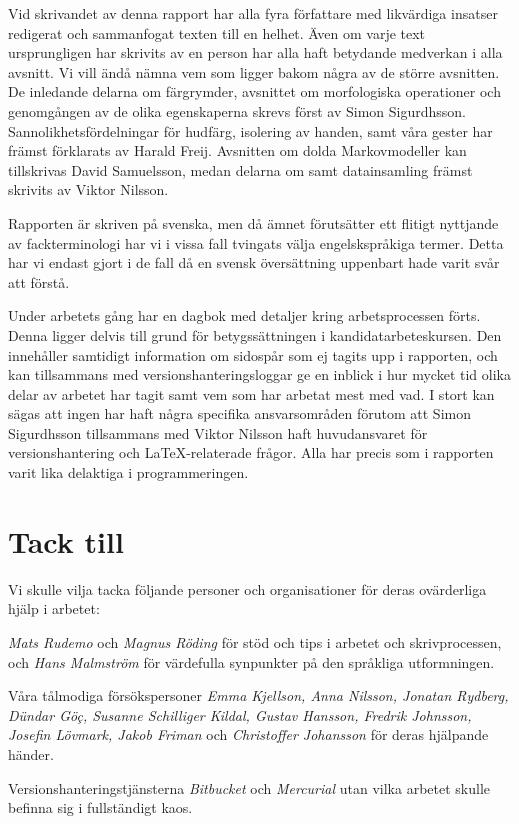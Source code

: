 \documentclass[../rapport_MVEX01-11-05]{subfiles}
\begin{document}
Vid skrivandet av denna rapport har alla fyra författare 
med likvärdiga insatser redigerat och sammanfogat
texten till en helhet. Även om varje text ursprungligen har skrivits av en
person har alla haft betydande medverkan i alla avsnitt.
Vi vill ändå nämna vem som ligger bakom några av de större avsnitten.
De inledande delarna om färgrymder, avsnittet om morfologiska operationer
och genomgången av de olika egenskaperna skrevs först av Simon Sigurdhsson.
Sannolikhetsfördelningar för hudfärg, isolering av handen, samt våra gester
har främst förklarats av Harald Freij.
Avsnitten om dolda Markovmodeller kan tillskrivas David Samuelsson, medan
delarna om \knn samt datainsamling främst skrivits av Viktor Nilsson.

Rapporten är skriven på svenska, men då ämnet förutsätter ett flitigt nyttjande
av fackterminologi har vi i vissa fall tvingats välja engelskspråkiga termer.
Detta har vi endast gjort i de fall då en svensk översättning uppenbart hade
varit svår att förstå.

Under arbetets gång har en dagbok med detaljer kring arbetsprocessen
förts. Denna ligger delvis till grund för betygssättningen i
kandidatarbeteskursen. Den innehåller samtidigt information om sidospår som ej
tagits upp i rapporten, och kan tillsammans med versionshanteringsloggar ge
en inblick i hur mycket tid olika delar av arbetet har tagit samt vem som har
arbetat mest med vad. I stort kan sägas att ingen har haft några specifika
ansvarsområden förutom att Simon Sigurdhsson tillsammans med Viktor
Nilsson haft huvudansvaret för versionshantering och \LaTeX-relaterade frågor.
Alla har precis som i rapporten varit lika delaktiga i programmeringen.

\cleardoublepage
\section*{Tack till}
Vi skulle vilja tacka följande personer och organisationer för deras
ovärderliga hjälp i arbetet:

\begin{list}{}{\leftmargin=1em\rightmargin=1em}
\item \emph{Mats Rudemo} och \emph{Magnus Röding} för stöd och tips i arbetet
och skrivprocessen, och
\emph{Hans Malmström} för värdefulla synpunkter på den språkliga utformningen.

\item Våra tålmodiga försökspersoner \emph{Emma Kjellson, Anna Nilsson,
Jonatan Rydberg, Dündar Göç, Susanne Schilliger Kildal, Gustav Hansson,
Fredrik Johnsson, Josefin Lövmark, Jakob Friman} och \emph{Christoffer
Johansson} för deras hjälpande händer.

\item Versionshanteringstjänsterna \emph{Bitbucket} och \emph{Mercurial} utan vilka
arbetet skulle befinna sig i fullständigt kaos.
\end{list}
\end{document}
